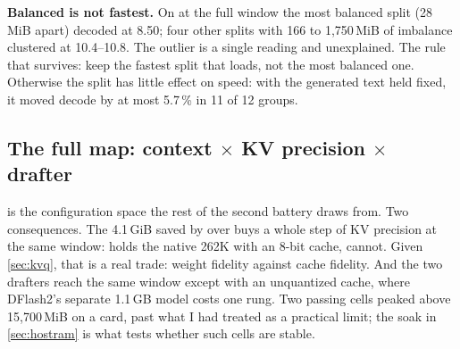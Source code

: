\textbf{Balanced is not fastest.} On \Qfive{} at the full window the most balanced split (28\,MiB
apart) decoded at 8.50\tps; four other splits with 166 to 1{,}750\,MiB of imbalance clustered at
10.4--10.8\tps. The outlier is a single reading and unexplained. The rule that survives: keep the
fastest split that loads, not the most balanced one. Otherwise the split has little effect on speed:
with the generated text held fixed, it moved decode by at most 5.7\,\% in 11 of 12 groups.

\subsection{The full map: context $\times$ KV precision $\times$ drafter}\label{sec:kvmap}

\begin{table}[t]
\centering\small
\caption{Largest window that loads, reports the requested size, prefills $\geq$94\,\% and generates
512 tokens. Second battery, upstream build E-C, layer split at each cell's best ratio, 71 launch
attempts; every ceiling below the native window is bracketed by a rung above it that failed twice. DFlash2 cells place the drafter
on GPU1 (). Bold: the full native window.}\label{tab:kvmap}
\end{table}

 is the configuration space the rest of the second battery draws from. Two
consequences. The 4.1\,GiB saved by \Qfour{} over \Qsix{} buys a whole step of KV precision at the
same window: \Qfour{} holds the native 262K with an 8-bit cache, \Qsix{} cannot. Given
\cref{sec:kvq}, that is a real trade: weight fidelity against cache fidelity. And the two drafters
reach the same window except with an unquantized cache, where DFlash2's separate 1.1\,GB model costs
one rung. Two passing cells peaked above 15{,}700\,MiB on a card, past what I had treated as a
practical limit; the soak in \cref{sec:hostram} is what tests whether such cells are stable.

